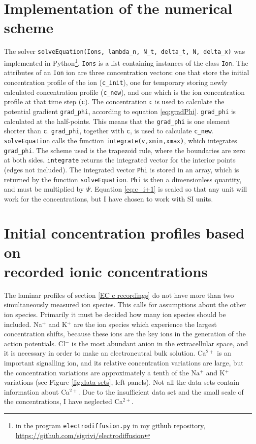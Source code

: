 \documentclass{uiophd}
\begin{document}
\section{Implementation of the numerical scheme}
The solver \texttt{solveEquation(Ions, lambda\_n, N\_t, delta\_t, N, delta\_x)} was implemented in Python\footnote{ in the program \texttt{electrodiffusion.py} in my github repository, \url{https://github.com/sigrivi/electrodiffusion}}.  \texttt{Ions} is a list containing instances of the class \texttt{Ion}. The attributes of an \texttt{Ion} ion are three concentration vectors: one that store the initial concentration profile of the ion (\texttt{c\_{init}}), one for temporary storing newly calculated concentration profile (\texttt{c\_{new}}), and one which is the ion concentration profile at that time step (\texttt{c}). The concentration \texttt{c} is used to calculate the potential gradient \texttt{grad\_phi}, according to equation \ref{eq:gradPhi}. \texttt{grad\_phi} is calculated at the half-points. This means that the \texttt{grad\_phi} is one element shorter than \texttt{c}. \texttt{grad\_{phi}}, together with \texttt{c}, is used to calculate \texttt{c\_new}. \texttt{solveEquation} calls the function \texttt{integrate(v,xmin,xmax)}, which integrates \texttt{grad\_phi}. The scheme used is the trapezoid rule, where the boundaries are zero at both sides. \texttt{integrate} returns the integrated vector for the interior points (edges not included). The integrated vector \texttt{Phi} is stored in an array, which is returned by the function \texttt{solveEquation}. \texttt{Phi} is then a dimensionless quantity, and must be multiplied by $\Psi$. Equation \ref{eq:c_i+1} is scaled so that any unit will work for the concentrations, but I have chosen to work with SI units. 

\section{Initial concentration profiles based on \\recorded ionic concentrations}\label{Initial concentration profiles}

The laminar profiles of section \ref{EC c recordings} do not have more than two simultaneously measured ion species. This calls for assumptions about the other ion species. Primarily it must be decided how many ion species should be included. Na$^+$ and K$^+$ are the ion species which experience the largest concentration shifts, because these ions are the key ions in the generation of the action potentials. Cl$^-$ is the most abundant anion in the extracellular space, and it is necessary in order to make an electroneutral bulk solution. Ca$^{2+}$ is an important signalling ion, and its relative concentration variations are large, but the concentration variations are approximately a tenth of the Na$^+$ and K$^+$ variations (see Figure \ref{fig:data sets}, left panels). Not all the data sets contain information about Ca$^{2+}$. Due to the insufficient data set and the small scale of the concentrations, I have neglected Ca$^{2+}$.  
\end{document}
